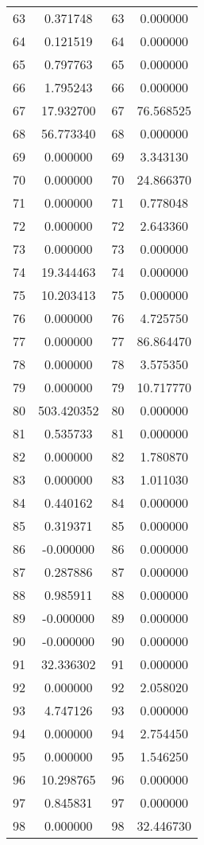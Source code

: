 \documentclass[12pt]{article}
\begin{document}
\begin{longtable}{@{}cccc@{}}
63 & 0.371748 & 63 & 0.000000 \\
64 & 0.121519 & 64 & 0.000000 \\
65 & 0.797763 & 65 & 0.000000 \\
66 & 1.795243 & 66 & 0.000000 \\
67 & 17.932700 & 67 & 76.568525 \\
68 & 56.773340 & 68 & 0.000000 \\
69 & 0.000000 & 69 & 3.343130 \\
70 & 0.000000 & 70 & 24.866370 \\
71 & 0.000000 & 71 & 0.778048 \\
72 & 0.000000 & 72 & 2.643360 \\
73 & 0.000000 & 73 & 0.000000 \\
74 & 19.344463 & 74 & 0.000000 \\
75 & 10.203413 & 75 & 0.000000 \\
76 & 0.000000 & 76 & 4.725750 \\
77 & 0.000000 & 77 & 86.864470 \\
78 & 0.000000 & 78 & 3.575350 \\
79 & 0.000000 & 79 & 10.717770 \\
80 & 503.420352 & 80 & 0.000000 \\
81 & 0.535733 & 81 & 0.000000 \\
82 & 0.000000 & 82 & 1.780870 \\
83 & 0.000000 & 83 & 1.011030 \\
84 & 0.440162 & 84 & 0.000000 \\
85 & 0.319371 & 85 & 0.000000 \\
86 & -0.000000 & 86 & 0.000000 \\
87 & 0.287886 & 87 & 0.000000 \\
88 & 0.985911 & 88 & 0.000000 \\
89 & -0.000000 & 89 & 0.000000 \\
90 & -0.000000 & 90 & 0.000000 \\
91 & 32.336302 & 91 & 0.000000 \\
92 & 0.000000 & 92 & 2.058020 \\
93 & 4.747126 & 93 & 0.000000 \\
94 & 0.000000 & 94 & 2.754450 \\
95 & 0.000000 & 95 & 1.546250 \\
96 & 10.298765 & 96 & 0.000000 \\
97 & 0.845831 & 97 & 0.000000 \\
98 & 0.000000 & 98 & 32.446730 \\

\end{longtable}
\end{document}
